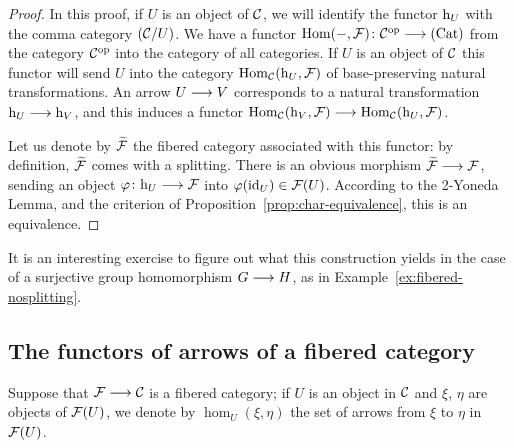 \begin{3   FIBERED CATEGORIES}
\begin{3.6 Objects as fibcats and the 2-Yoneda}
\begin{proof}
In this proof, if $U$ is an object of $\mathcal{C}$, we will identify the functor $\mathrm{h}_{U}$ with the comma category $(\mathcal{C}/U)$. We have a functor $\hom(-, \cF) \colon \cC\op \arr \cat{Cat}$ from the category $\mathcal{C}^{\mathrm{op}}$ into the category of all categories. If $U$ is an object of $\mathcal{C}$ this functor will send $U$ into the category $\operatorname{Hom}_{\mathcal{C}}(\mathrm{h}_{U}, \mathcal{F})$ of base-preserving natural transformations. An arrow $U \arr V$ corresponds to a natural transformation $\h_{U} \arr \h_{V}$, and this induces a functor $\hom_{\cC}(\h_{V}, \cF) \arr \hom_{\cC}(\h_{U}, \cF)$.

Let us denote by $\widetilde{\mathcal{F}}$ the fibered category associated with this functor: by definition, $\widetilde{\mathcal{F}}$ comes with a splitting. There is an obvious morphism $\widetilde{\cF} \arr \cF$, sending an object $\phi \colon \h_{U} \arr \cF$ into $\varphi(\mathrm{id}_{U}) \in \mathcal{F}(U)$. According to the 2-Yoneda Lemma, and the criterion of Proposition~\ref{prop:char-equivalence}, this is an equivalence.
\end{proof}

It is an interesting exercise to figure out what this construction yields in the case of a surjective group homomorphism $G \arr H$, as in Example~\ref{ex:fibered-nosplitting}.




\end{3.6 Objects as fibcats and the 2-Yoneda}
\begin{3.7 The functors of arrows of a fibcat}
\setcounter{section}{6}
\section{The functors of arrows of a fibered category}
\label{sec:func-arrows}
\setcounter{theorem}{45}

Suppose that $\cF \arr \cC$ is a fibered category; if $U$ is an object in $\mathcal{C}$ and $\xi$, $\eta$ are objects of $\mathcal{F}(U)$, we denote by $\hom_U(\xi, \eta)$ the set of arrows from $\xi$ to $\eta$ in $\mathcal{F}(U)$.


\end{3.7 The functors of arrows of a fibcat}
\end{3   FIBERED CATEGORIES}
